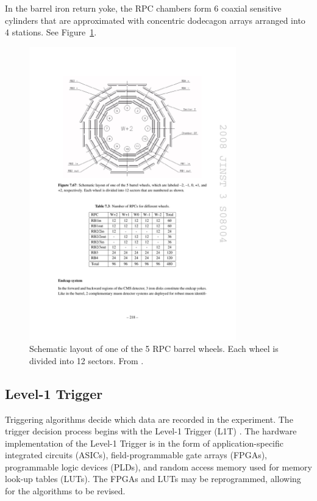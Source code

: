 In the barrel iron return yoke, the RPC chambers form 6 coaxial sensitive cylinders
that are approximated with concentric dodecagon arrays arranged into 4 stations. See Figure~\ref{fig:cms_rpc_barrel}.

\begin{figure}[hbtp]
\centering
\includegraphics[width=0.8\textwidth]{figures/cms_rpc_barrel.pdf}
\caption{
Schematic layout of one of the 5 RPC barrel wheels. Each wheel is divided into 12 sectors.
From \cite{Chatrchyan:2008aa}.
}
\label{fig:cms_rpc_barrel}
\end{figure}
\clearpage

\subsection{Level-1 Trigger}
Triggering algorithms decide which data are recorded in the experiment.
The trigger decision process begins with the Level-1 Trigger (L1T) \cite{Khachatryan:2016bia}.  
The hardware implementation of the Level-1 Trigger is in the form of application-specific
integrated circuits (ASICs), field-programmable gate arrays (FPGAs), 
programmable logic devices (PLDs), and random access memory used for memory look-up tables (LUTs).
The FPGAs and LUTs may be reprogrammed, allowing for the algorithms to be revised.

